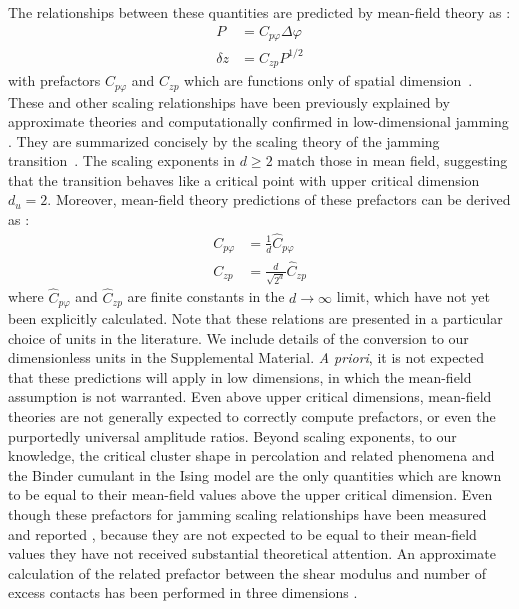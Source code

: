 The relationships between these quantities are predicted by mean-field theory as \cite{parisi_theory_2020}:
%
\begin{align}
P&=C_{p\varphi}\Delta \varphi \label{eqn:pvsphi} \\ 
\delta z&=C_{zp}P^{1/2} \label{eqn:evsp} 
\end{align}
%
with prefactors $C_{p\varphi}$ and $C_{zp}$ which are functions only of spatial dimension~\cite{ohern_jamming_2003}. These and other scaling relationships have been previously explained by approximate theories \cite{wyart_effects_2005, wyart_rigidity_2005,zaccone_approximate_2011,liarte_jamming_2019} and computationally confirmed in low-dimensional jamming \cite{ohern_jamming_2003, ohern_random_2002,liu_jamming_2010,goodrich_finite-size_2012}. They are summarized concisely by the scaling theory of the jamming transition~\cite{goodrich_scaling_2016}. The scaling exponents in $d \geq2$ match those in mean field, suggesting that the transition behaves like a critical point with upper critical dimension $d_u=2$.  Moreover, mean-field theory predictions of these prefactors can be derived as \cite{parisi_theory_2020,franz_universality_2017}:
\begin{align}
C_{p\varphi} &=   \frac{1}{d} \hat{C}_{p\varphi} \label{eqn:meanFieldPressurePhi}\\
C_{zp} &= \frac{d}{\sqrt{2^{d}}} \hat{C}_{zp} \label{eqn:meanFieldExcessPressure}
 \end{align}
where $\hat{C}_{p\varphi}$ and $\hat{C}_{zp}$ are finite constants in the $d\rightarrow\infty$ limit, which have not yet been explicitly calculated. Note that these relations are presented in a particular choice of units in the literature. We include details of the conversion to our dimensionless units in the Supplemental Material. \textit{A priori}, it is not expected that these predictions will apply in low dimensions, in which the mean-field assumption is not warranted. Even above upper critical dimensions, mean-field theories are not generally expected to correctly compute prefactors, or even the purportedly universal amplitude ratios. Beyond scaling exponents, to our knowledge, the critical cluster shape in percolation and related phenomena \cite{aronovitz_universal_1987,privman_universal_1991} and the Binder cumulant in the Ising model \cite{brizin_finite_1985, parisi_scaling_1996, blote_universality_1997} are the only quantities which are known to be equal to their mean-field values above the upper critical dimension. Even though these prefactors for jamming scaling relationships have been measured and reported \cite{ohern_jamming_2003,sartor_direct_2020}, because they are not expected to be equal to their mean-field values they have not received substantial theoretical attention. An approximate calculation of the related prefactor between the shear modulus and number of excess contacts has been performed in three dimensions \cite{zaccone_approximate_2011}.

